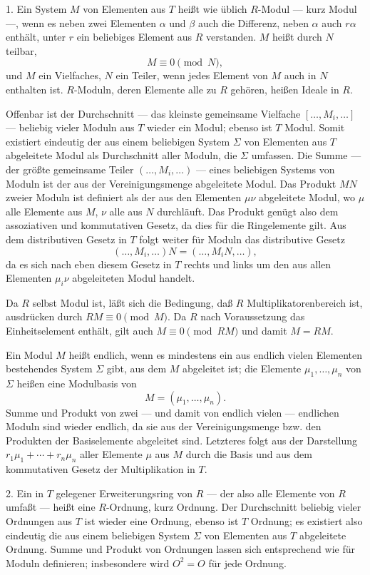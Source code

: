 \documentclass[11pt]{article}
\begin{document}
1. Ein System $M$ von Elementen aus $T$ heißt wie üblich $R$-Modul — kurz
Modul —, wenn es neben zwei Elementen $\alpha$ und $\beta$ auch die Differenz,
neben $\alpha$ auch $r\alpha$ enthält, unter $r$ ein beliebiges Element aus $R$
verstanden. $M$ heißt durch $N$ teilbar,
\[
        M\equiv 0 \pmod N,
\]
und $M$ ein Vielfaches, $N$ ein Teiler, wenn jedes Element von $M$ auch in $N$
enthalten ist. $R$-Moduln, deren Elemente alle zu $R$ gehören, heißen Ideale in $R$.

Offenbar ist der Durchschnitt — das kleinste gemeinsame Vielfache $[\ldots,M_i,\ldots]$
— beliebig vieler Moduln aus $T$ wieder ein Modul; ebenso ist $T$ Modul. Somit
existiert eindeutig der aus einem beliebigen System $\Sigma$ von Elementen aus $T$
abgeleitete Modul als Durchschnitt aller Moduln, die $\Sigma$ umfassen. Die Summe
— der größte gemeinsame Teiler $(\ldots,M_i,\ldots)$ — eines beliebigen Systems von
Moduln ist der aus der Vereinigungsmenge abgeleitete Modul. Das Produkt $MN$
zweier Moduln ist definiert als der aus den Elementen $\mu\nu$ abgeleitete Modul,
wo $\mu$ alle Elemente aus $M$, $\nu$ alle aus $N$ durchläuft. Das Produkt genügt
also dem assoziativen und kommutativen Gesetz, da dies für die Ringelemente gilt.
Aus dem distributiven Gesetz in $T$ folgt weiter für Moduln das distributive Gesetz
\[
        (\ldots,M_i,\ldots)N=(\ldots,M_iN,\ldots),
\]
da es sich nach eben diesem Gesetz in $T$ rechts und links um den aus allen
Elementen $\mu_i\nu$ abgeleiteten Modul handelt.

Da $R$ selbst Modul ist, läßt sich die Bedingung, daß $R$ Multiplikatorenbereich
ist, ausdrücken durch $RM\equiv0\pmod M$. Da $R$ nach Voraussetzung das
Einheitselement enthält, gilt auch $M\equiv0\pmod{RM}$ und damit $M=RM$.

Ein Modul $M$ heißt endlich, wenn es mindestens ein aus endlich vielen Elementen
bestehendes System $\Sigma$ gibt, aus dem $M$ abgeleitet ist; die Elemente
$\mu_1,\ldots,\mu_n$ von $\Sigma$ heißen eine Modulbasis von
\[
        M=(\mu_1,\ldots,\mu_n).
\]
Summe und Produkt von zwei — und damit von endlich vielen — endlichen Moduln
sind wieder endlich, da sie aus der Vereinigungsmenge bzw. den Produkten der
Basiselemente abgeleitet sind. Letzteres folgt aus der Darstellung
$r_1\mu_1+\cdots+r_n\mu_n$ aller Elemente $\mu$ aus $M$ durch die Basis und aus
dem kommutativen Gesetz der Multiplikation in $T$.

2. Ein in $T$ gelegener Erweiterungsring von $R$ — der also alle Elemente von
$R$ umfaßt — heißt eine $R$-Ordnung, kurz Ordnung. Der Durchschnitt beliebig
vieler Ordnungen aus $T$ ist wieder eine Ordnung, ebenso ist $T$ Ordnung; es
existiert also eindeutig die aus einem beliebigen System $\Sigma$ von Elementen
aus $T$ abgeleitete Ordnung. Summe und Produkt von Ordnungen lassen sich
entsprechend wie für Moduln definieren; insbesondere wird $O^2=O$ für jede
Ordnung.
\end{document}
